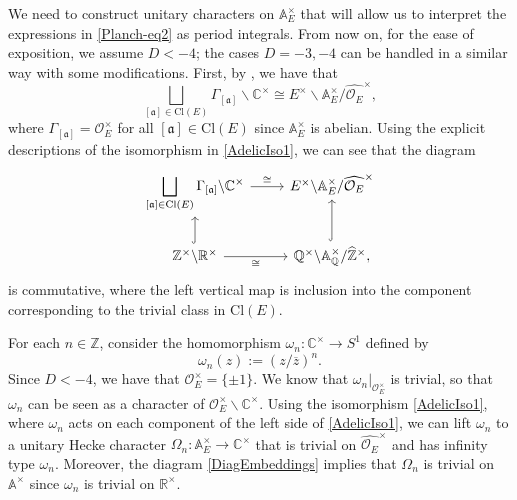 \documentclass[11pt]{amsart}
\newcommand{\bigo}{\mathcal{O}}
\newcommand{\R}{\mathbb{R}}
\newcommand{\Z}{\mathbb{Z}}
\newcommand{\C}{\mathbb{C}}
\newcommand{\A}{\mathbb{A}}
\renewcommand{\a}{\mathfrak{a}}
\theoremstyle{definition}
\theoremstyle{remark}
\begin{document}
We need to construct unitary characters on $\A_{E}^{\times}$ that will allow us to interpret the expressions in \eqref{Planch-eq2} as period integrals. From now on, for the ease of exposition, we assume $D<-4$; the cases $D=-3,-4$ can be handled in a similar way with some modifications. First, by \cite[eq. (2.20)]{AutRepGetz}, we have that 
\begin{equation}
    \bigsqcup_{[\a] \in \mathrm{Cl}(E)} \Gamma_{[\a]} \backslash \C^{\times} \cong E^{\times} \backslash \A_{E}^{\times} / \widehat{\bigo_E}^{\times}, \label{AdelicIso1}
\end{equation}
where $\Gamma_{[\a]} = \bigo_E^{\times}$ for all $[\a] \in \mathrm{Cl}(E)$ since $\A_{E}^{\times}$ is abelian. Using the explicit descriptions of the isomorphism in \eqref{AdelicIso1}, we can see that the diagram
\begin{equation}
\begin{tikzcd}
	{\displaystyle \bigsqcup_{[\a] \in \mathrm{Cl}(E)} \Gamma_{[\a]} \backslash \mathbb{C}^{\times}} & {E^{\times} \backslash \mathbb{A}_{E}^{\times} / \widehat{\mathcal{O}_E}^{\times}} \\
	{\Z^{\times} \backslash \R^{\times}} & {\mathbb{Q}^{\times} \backslash \mathbb{A}_{\mathbb{Q}}^{\times} / \widehat{\Z}^{\times}},
	\arrow["\cong", from=1-1, to=1-2]
	\arrow[hook, from=2-1, to=1-1]
	\arrow["\cong"', from=2-1, to=2-2]
	\arrow[hook, from=2-2, to=1-2]
\end{tikzcd} \label{DiagEmbeddings}
\end{equation}
is commutative, where the left vertical map is inclusion into the component corresponding to the trivial class in $\mathrm{Cl}(E)$.

For each $n\in \Z$, consider the homomorphism $\omega_n : \C^{\times} \rightarrow S^1$ defined by $$ \omega_n(z) := \left( z/\overline{z} \right)^n.$$ Since $D<-4$, we have that $\bigo_{E}^{\times} = \{ \pm 1\}$. We know that $\omega_n|_{\bigo_{E}^{\times}}$ is trivial, so that $\omega_n$ can be seen as a character of $\bigo_E^{\times} \backslash \C^{\times}$. Using the isomorphism \eqref{AdelicIso1}, where $\omega_n$ acts on each component of the left side of \eqref{AdelicIso1}, we can lift $\omega_n$ to a unitary Hecke character $\Omega_n : \A_{E}^{\times} \rightarrow \C^{\times}$ that is trivial on $\widehat{\bigo_E}^{\times}$ and has infinity type $\omega_n$. Moreover, the diagram \eqref{DiagEmbeddings} implies that $\Omega_n$ is trivial on $\A^{\times}$ since $\omega_n$ is trivial on $\R^{\times}$.
\end{document}
